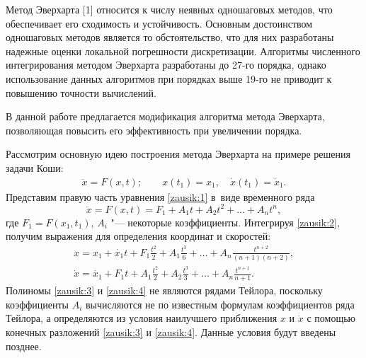 
\date{02/V/2012} %



\maketitle


Метод  Эверхарта [1] относится к числу неявных одношаговых методов, что обеспечивает его сходимость и устойчивость. Основным достоинством одношаговых методов является то обстоятельство, что для них разработаны надежные оценки локальной погрешности дискретизации. Алгоритмы численного интегрирования методом  Эверхарта разработаны до 27-го порядка, однако использование данных алгоритмов при порядках выше 19-го не приводит к повышению точности вычислений.

В данной работе предлагается модификация алгоритма метода  Эверхарта, позволяющая повысить его эффективность при увеличении порядка.

\smallskip

Рассмотрим основную идею построения метода  Эверхарта на примере решения задачи Коши:
\begin{gather}
\ddot{x}=F(x,t);\qquad  x(t_1)=x_1,\quad \dot{x}(t_1)=\dot{x}_1 .
\label{zausik:1}
\end{gather}
Представим правую часть уравнения \eqref{zausik:1} в~виде временного ряда
\begin{equation}
\ddot{x}=F(x,t)=F_1+A_1 t+A_2 t^2+\dots +A_n t^n,
\label{zausik:2}
\end{equation}
где $F_1=F(x_1, t_1)$, $A_i$ "--- некоторые коэффициенты.
Интегрируя \eqref{zausik:2}, получим выражения для определения координат и скоростей:
\begin{gather}
x=x_1+\dot{x_1}t+F_1 \frac{t^2}{2}+A_1\frac{t^3}{6}+\dots+A_n\frac{t^{n+2}}{(n+1)(n+2)},
\label{zausik:3}
\\
\dot{x}=\dot{x_1}+F_1t+A_1\frac{t^2}{2}+ A_2\frac{t^3}{3}+\dots+A_n\frac{t^{n+1}}{n+1}.
\label{zausik:4}
\end{gather}
Полиномы \eqref{zausik:3} и \eqref{zausik:4} не являются рядами Тейлора, поскольку коэффициенты $A_i$ вычисляются не по известным формулам коэффициентов ряда Тейлора, а определяются из условия наилучшего приближения $x$ и $\dot{x}$ с помощью конечных разложений \eqref{zausik:3} и \eqref{zausik:4}. Данные условия будут введены позднее.

